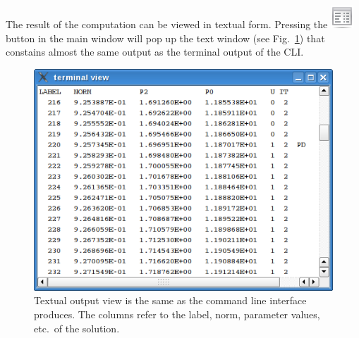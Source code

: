 \documentclass[10pt,a4paper]{ddedoc}
\newcommand{\iconText}{\protect\includegraphics[height=0.8\baselineskip]{fig/cr32-action-view_text}}
\begin{document}
The result of the computation can be viewed in textual form. Pressing the
 \iconText{} button in the main window
will pop up the text window (see Fig.\ \ref{textwindow}) that constains almost
the same output as the terminal output of the CLI.
\begin{figure}[bth!]
\begin{center}
\includegraphics[scale=0.5]{fig/textwindow}
\caption{Textual output view is the same as the command line interface produces. The columns refer to the label,
norm, parameter values, etc.\ of the solution.}
\label{textwindow}
\end{center}
\end{figure}
\end{document}
